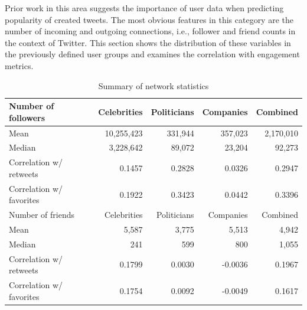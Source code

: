 Prior work in this area suggests the importance of user data when predicting
popularity of created tweets.
The most obvious features in this category are the number of incoming and outgoing
connections, i.e., follower and friend counts in the context of Twitter.
This section shows the distribution of these variables in the previously
defined user groups and examines the correlation with engagement metrics.

\begin{table}
\begin{tabular}{lrrrr}
\toprule
  Number of followers & Celebrities & Politicians & Companies & Combined\\
\midrule
  Mean & 10,255,423 & 331,944 & 357,023 & 2,170,010\\
  Median & 3,228,642 & 89,072 & 23,204 & 92,273\\
  Correlation w/ retweets & 0.1457 & 0.2828 & 0.0326 & 0.2947\\
  Correlation w/ favorites & 0.1922 & 0.3423 & 0.0442 & 0.3396\\
\midrule
  Number of friends & Celebrities & Politicians & Companies & Combined\\
\midrule
  Mean & 5,587 & 3,775 & 5,513 & 4,942\\
  Median & 241 & 599 & 800 & 1,055\\
  Correlation w/ retweets & 0.1799 & 0.0030 & -0.0036 & 0.1967\\
  Correlation w/ favorites & 0.1754 & 0.0092 & -0.0049 & 0.1617\\
\bottomrule
\end{tabular}
\caption{Summary of network statistics}
\label{tab:network_summary}
\end{table}

